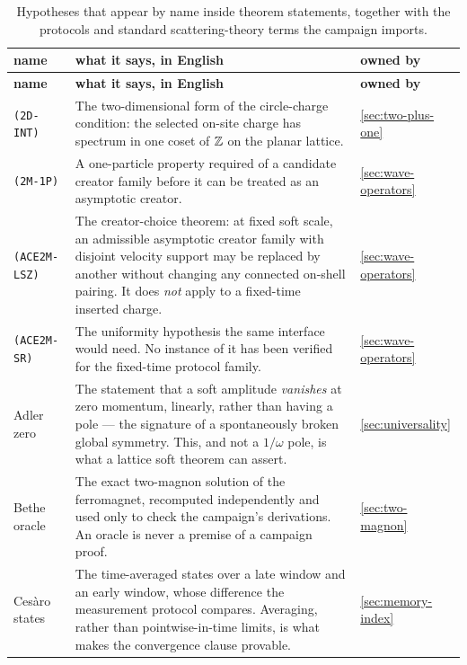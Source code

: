 {\footnotesize
\begin{longtable}{@{}p{}p{}p{}@{}}
\caption{Hypotheses that appear by name inside theorem statements, together
with the protocols and standard scattering-theory terms the campaign imports.}
\label{tab:dict-hyps}\\
\toprule
\textbf{name} & \textbf{what it says, in English} & \textbf{owned by}\\
\midrule
\endfirsthead
\toprule
\textbf{name} & \textbf{what it says, in English} & \textbf{owned by}\\
\midrule
\endhead
\bottomrule
\endfoot

\texttt{(2D-INT)} & The two-dimensional form of the circle-charge condition:
the selected on-site charge has spectrum in one coset of $\mathbb{Z}$ on the planar
lattice. & \cref{sec:two-plus-one}\\

\texttt{(2M-1P)} & A one-particle property required of a candidate creator
family before it can be treated as an asymptotic creator. & \cref{sec:wave-operators}\\

\texttt{(ACE2M-LSZ)} & The creator-choice theorem: at fixed soft scale, an
admissible asymptotic creator family with disjoint velocity support may be
replaced by another without changing any connected on-shell pairing. It does
\emph{not} apply to a fixed-time inserted charge. & \cref{sec:wave-operators}\\

\texttt{(ACE2M-SR)} & The uniformity hypothesis the same interface would need.
No instance of it has been verified for the fixed-time protocol family. & \cref{sec:wave-operators}\\

Adler zero & The statement that a soft amplitude \emph{vanishes} at zero
momentum, linearly, rather than having a pole --- the signature of a
spontaneously broken global symmetry. This, and not a $1/\omega$ pole, is what
a lattice soft theorem can assert. & \cref{sec:universality}\\

Bethe oracle & The exact two-magnon solution of the ferromagnet, recomputed
independently and used only to check the campaign's derivations. An oracle is
never a premise of a campaign proof. & \cref{sec:two-magnon}\\

Ces\`aro states & The time-averaged states over a late window and an early
window, whose difference the measurement protocol compares. Averaging, rather
than pointwise-in-time limits, is what makes the convergence clause provable. & \cref{sec:memory-index}\\


\end{longtable}}
